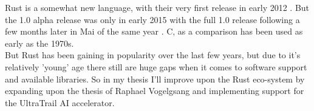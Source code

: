 
%

Rust \cite{rustlang} is a somewhat new language,
with their very first release in early 2012 \cite{rust_releases}.
But the 1.0 alpha release was only in early 2015 \cite{rust_releases}
with the full 1.0 release following a few months later in Mai of the same year \cite{rust_releases}.
C, as a comparison has been used as early as the 1970s.\\
But Rust has been gaining in popularity \cite{rust_popularity} over the last few years, but
due to it's relatively 'young' age there still are huge gaps when it comes to software support and available libraries.
So in my thesis I'll improve upon the Rust eco-system by expanding upon the thesis of Raphael Vogelgsang \cite{rust_pulp}
and implementing support for the UltraTrail \cite{ultratrail} AI accelerator.
